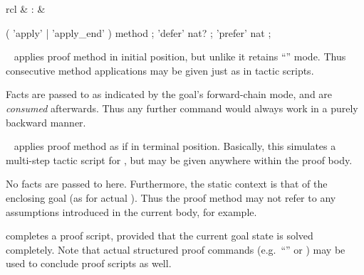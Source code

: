 \begin{isabellebody}
\begin{isamarkuptext}
\begin{matharray}{rcl}
    \hypertarget{command.back}{\hyperlink{command.back}{\mbox{}}}\isa{{\isachardoublequote}\isactrlsup {\isacharasterisk}{\isachardoublequote}} & : &  \\
  \end{matharray}

  \begin{rail}
    ( 'apply' | 'apply\_end' ) method
    ;
    'defer' nat?
    ;
    'prefer' nat
    ;
  \end{rail}

  \begin{description}

  \item \hyperlink{command.apply}{\mbox{}}~ applies proof method  in
  initial position, but unlike \hyperlink{command.proof}{\mbox{}} it retains ``'' mode.  Thus consecutive method applications may be
  given just as in tactic scripts.
  
  Facts are passed to  as indicated by the goal's
  forward-chain mode, and are \emph{consumed} afterwards.  Thus any
  further \hyperlink{command.apply}{\mbox{}} command would always work in a purely
  backward manner.
  
  \item \hyperlink{command.apply-end}{\mbox{}}~ applies proof method  as if in terminal position.  Basically, this simulates a
  multi-step tactic script for \hyperlink{command.qed}{\mbox{}}, but may be given
  anywhere within the proof body.
  
  No facts are passed to  here.  Furthermore, the static
  context is that of the enclosing goal (as for actual \hyperlink{command.qed}{\mbox{}}).  Thus the proof method may not refer to any assumptions
  introduced in the current body, for example.
  
  \item \hyperlink{command.done}{\mbox{}} completes a proof script, provided that the
  current goal state is solved completely.  Note that actual
  structured proof commands (e.g.\ ``\hyperlink{command.dot}{\mbox{\isa{\isacommand{{\isachardot}}}}}'' or \hyperlink{command.sorry}{\mbox{}}) may be used to conclude proof scripts as well.


\end{description}
\end{isamarkuptext}
\end{isabellebody}
